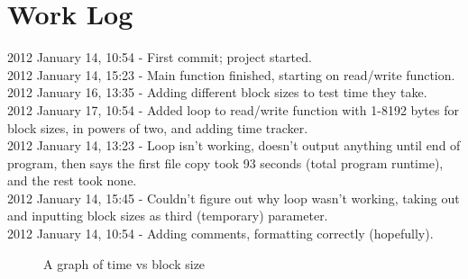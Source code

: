 \documentclass[letterpaper,10pt,onecolumn,titlepage]{article}
\begin{document}
\section {Work Log}
2012 January 14, 10:54 - First commit; project started.
\\
2012 January 14, 15:23 - Main function finished, starting on read/write function.
\\
2012 January 16, 13:35 - Adding different block sizes to test time they take.
\\
2012 January 17, 10:54 - Added loop to read/write function with 1-8192 bytes for block sizes, in powers of two, and adding time tracker.
\\
2012 January 14, 13:23 - Loop isn't working, doesn't output anything until end of program, then says the first file copy took 93 seconds (total program runtime), and the rest took none.
\\
2012 January 14, 15:45 - Couldn't figure out why loop wasn't working, taking out and inputting block sizes as third (temporary) parameter.
\\
2012 January 14, 10:54 - Adding comments, formatting correctly (hopefully).
\\

\begin{figure}[b]
	\centering
	  \caption{A graph of time vs block size}
\end{figure}
\end{document}
